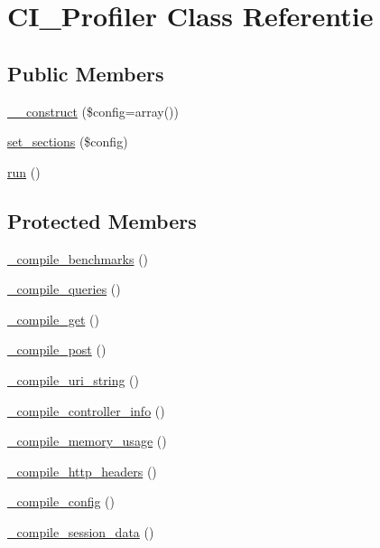 \hypertarget{class_c_i___profiler}{}\section{C\+I\+\_\+\+Profiler Class Referentie}
\label{class_c_i___profiler}
\subsection*{Public Members}
\begin{DoxyCompactItemize}
\item 
\mbox{\hyperlink{class_c_i___profiler_af7f9493844d2d66e924e3c1df51ce616}{\+\_\+\+\_\+construct}} (\$config=array())
\item 
\mbox{\hyperlink{class_c_i___profiler_a81c587d7a2a249d05f28c96a135591f7}{set\+\_\+sections}} (\$config)
\item 
\mbox{\hyperlink{class_c_i___profiler_afb0fafe7e02a3ae1993c01c19fad2bae}{run}} ()
\end{DoxyCompactItemize}
\subsection*{Protected Members}
\begin{DoxyCompactItemize}
\item 
\mbox{\hyperlink{class_c_i___profiler_acecf392de9d6129d3843c64fca7a4766}{\+\_\+compile\+\_\+benchmarks}} ()
\item 
\mbox{\hyperlink{class_c_i___profiler_a5d16e69fed0307c51b9479ebbb2049b6}{\+\_\+compile\+\_\+queries}} ()
\item 
\mbox{\hyperlink{class_c_i___profiler_a94ef351d1234fe87ee3f5cd7c855f8a5}{\+\_\+compile\+\_\+get}} ()
\item 
\mbox{\hyperlink{class_c_i___profiler_a42ae55500668793b1cec3d79b6ea9209}{\+\_\+compile\+\_\+post}} ()
\item 
\mbox{\hyperlink{class_c_i___profiler_a781803c49bf0c92d47187c76ebb42a1b}{\+\_\+compile\+\_\+uri\+\_\+string}} ()
\item 
\mbox{\hyperlink{class_c_i___profiler_a46a079522432af283c844f043ba5a513}{\+\_\+compile\+\_\+controller\+\_\+info}} ()
\item 
\mbox{\hyperlink{class_c_i___profiler_a409e57ba71d0463bb684925e2c6a5658}{\+\_\+compile\+\_\+memory\+\_\+usage}} ()
\item 
\mbox{\hyperlink{class_c_i___profiler_a80a22812f0243b3daaf78e3614bddadb}{\+\_\+compile\+\_\+http\+\_\+headers}} ()
\item 
\mbox{\hyperlink{class_c_i___profiler_affb7543f1c67a5b3ff24eaefcec37e6d}{\+\_\+compile\+\_\+config}} ()
\item 
\mbox{\hyperlink{class_c_i___profiler_a65f7d92ff03632e35cd506dd500a2dd7}{\+\_\+compile\+\_\+session\+\_\+data}} ()
\end{DoxyCompactItemize}
